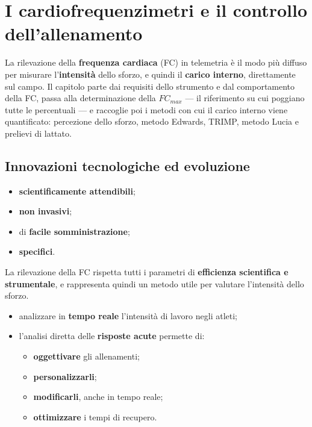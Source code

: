 \chapter{I cardiofrequenzimetri e il controllo dell'allenamento}
\label{cap:cardiofrequenzimetri}

La rilevazione della \textbf{frequenza cardiaca} (FC) in telemetria è il modo più diffuso per
misurare l'\textbf{intensità} dello sforzo, e quindi il \textbf{carico interno}, direttamente sul
campo. Il capitolo parte dai requisiti dello strumento e dal comportamento della FC, passa alla
determinazione della $FC_{max}$ --- il riferimento su cui poggiano tutte le percentuali --- e
raccoglie poi i metodi con cui il carico interno viene quantificato: percezione dello sforzo,
metodo Edwards, TRIMP, metodo Lucia e prelievi di lattato.

\section{Innovazioni tecnologiche ed evoluzione}

\begin{itemize}
  \item \textbf{scientificamente attendibili};
  \item \textbf{non invasivi};
  \item di \textbf{facile somministrazione};
  \item \textbf{specifici}.
\end{itemize}

La rilevazione della FC rispetta tutti i parametri di \textbf{efficienza scientifica e
strumentale}, e rappresenta quindi un metodo utile per valutare l'intensità dello sforzo.

\begin{itemize}
  \item analizzare in \textbf{tempo reale} l'intensità di lavoro negli atleti;
  \item l'analisi diretta delle \textbf{risposte acute} permette di:
    \begin{itemize}
      \item \textbf{oggettivare} gli allenamenti;
      \item \textbf{personalizzarli};
      \item \textbf{modificarli}, anche in tempo reale;
      \item \textbf{ottimizzare} i tempi di recupero.
    \end{itemize}
\end{itemize}

